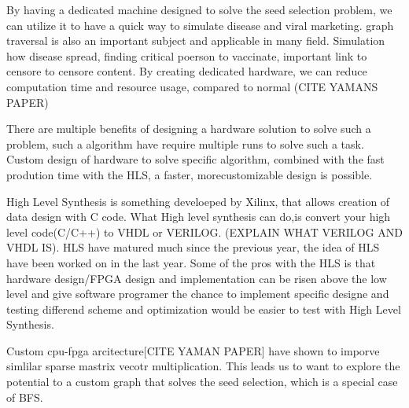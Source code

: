 By having a dedicated machine designed to solve the seed selection problem, we can utilize it to have a quick way to simulate disease and viral marketing. graph traversal is also an important subject and applicable in many field. Simulation how disease spread, finding critical poerson to vaccinate, important link to censore to censore content. By creating dedicated hardware, we can reduce computation time and resource usage, compared to normal  (CITE YAMANS PAPER)

There are multiple benefits of designing a hardware solution to solve such a problem, such a algorithm have require multiple runs to solve such a task. Custom design of hardware to solve specific algorithm, combined with the fast prodution time with the HLS, a faster, morecustomizable design is possible.

High Level Synthesis is something develoeped by Xilinx, that allows creation of data design with C code. What High level synthesis can do,is convert your high level code(C/C++) to VHDL or VERILOG. (EXPLAIN WHAT VERILOG AND VHDL IS). 
HLS have matured much since the previous year, the idea of HLS have been worked on in the last year. Some of the pros with the HLS is that hardware design/FPGA design and implementation can be risen above the low level and give software programer the chance to implement specific designe and testing differend scheme and optimization would be easier to test with High Level Synthesis.

Custom cpu-fpga arcitecture[CITE YAMAN PAPER] have shown to imporve simlilar sparse mastrix vecotr multiplication. This leads us to want to explore the potential to a custom graph that solves the seed selection, which is a special case of BFS. 